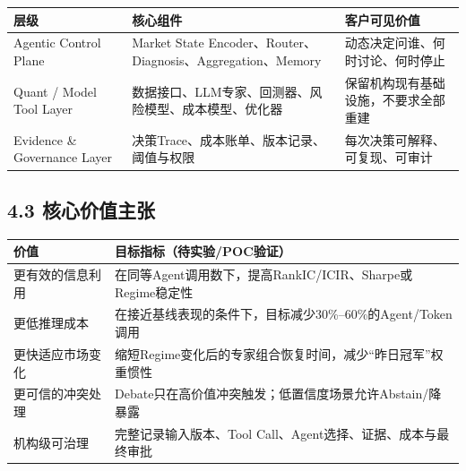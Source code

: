 \documentclass[12pt,a4paper]{ctexart}
\begin{document}
\begin{longtable}[]{@{}
  >{\raggedright\arraybackslash}p{}
  >{\raggedright\arraybackslash}p{}
  >{\raggedright\arraybackslash}p{}@{}}
\toprule\noalign{}
\begin{minipage}[b]{\linewidth}\centering
\textbf{层级}
\end{minipage} & \begin{minipage}[b]{\linewidth}\centering
\textbf{核心组件}
\end{minipage} & \begin{minipage}[b]{\linewidth}\centering
\textbf{客户可见价值}
\end{minipage} \\
\midrule\noalign{}
\endhead
\bottomrule\noalign{}
\endlastfoot
Agentic Control Plane & Market State
Encoder、Router、Diagnosis、Aggregation、Memory &
动态决定问谁、何时讨论、何时停止 \\
Quant / Model Tool Layer &
数据接口、LLM专家、回测器、风险模型、成本模型、优化器 &
保留机构现有基础设施，不要求全部重建 \\
Evidence \& Governance Layer & 决策Trace、成本账单、版本记录、阈值与权限
& 每次决策可解释、可复现、可审计 \\
\end{longtable}

\subsection{\texorpdfstring{\textbf{4.3
核心价值主张}}{4.3 核心价值主张}}\label{ux6838ux5fc3ux4ef7ux503cux4e3bux5f20}

\begin{longtable}[]{@{}
  >{\raggedright\arraybackslash}p{}
  >{\raggedright\arraybackslash}p{}@{}}
\toprule\noalign{}
\begin{minipage}[b]{\linewidth}\centering
\textbf{价值}
\end{minipage} & \begin{minipage}[b]{\linewidth}\centering
\textbf{目标指标（待实验/POC验证）}
\end{minipage} \\
\midrule\noalign{}
\endhead
\bottomrule\noalign{}
\endlastfoot
更有效的信息利用 &
在同等Agent调用数下，提高RankIC/ICIR、Sharpe或Regime稳定性 \\
更低推理成本 &
在接近基线表现的条件下，目标减少30\%--60\%的Agent/Token调用 \\
更快适应市场变化 &
缩短Regime变化后的专家组合恢复时间，减少``昨日冠军''权重惯性 \\
更可信的冲突处理 &
Debate只在高价值冲突触发；低置信度场景允许Abstain/降暴露 \\
机构级可治理 & 完整记录输入版本、Tool
Call、Agent选择、证据、成本与最终审批 \\
\end{longtable}
\end{document}
